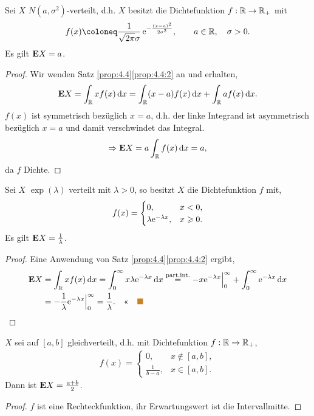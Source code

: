 \begin{bsp}
Sei $X$ $N(a, \sigma ^{2})$-verteilt, d.h. $X$ besitzt die Dichtefunktion $f:
\mathbb{R} \to \mathbb{R}_{+}$ mit
\begin{align*}
f(x) \defl \frac{1}{\sqrt{2 \pi }\sigma }\,\e^{-\frac{(x-a)^{2}}{2\sigma
^{2}}},\qquad a \in \R,\quad \sigma > 0.
\end{align*}
Es gilt $\textbf{E} X=a$.
\begin{proof}
Wir wenden Satz \ref{prop:4.4}\ref{prop:4.4:2} an und erhalten,
\begin{align*}
\textbf{E} X =\int_{\mathbb{R}} xf(x)\,\mathrm{d} x
= \int_{\mathbb{R}} (x-a)f(x)\,\mathrm{d} x + \int_{\mathbb{R}} a f(x) \,\mathrm{d} x.
\end{align*}
$f(x)$ ist symmetrisch bezüglich $x=a$, d.h. der linke Integrand ist
asymmetrisch bezüglich $x=a$ und damit verschwindet das Integral.
\begin{align*}
\Rightarrow \textbf{E} X = a \int_{\mathbb{R}} f(x)\,\mathrm{d} x = a,
\end{align*}
da $f$ Dichte.\qedhere\bsphere
\end{proof}
\end{bsp}
\begin{bsp}
Sei $X$ $\exp(\lambda)$ verteilt mit $\lambda > 0$, so besitzt $X$ die
Dichtefunktion $f$ mit,
\begin{align*}
f(x) =
\begin{cases}
0,& x < 0,\\
\lambda \mathrm{e}^{-\lambda x},& x \geqslant 0.
\end{cases}
\end{align*}
Es gilt $\textbf{E} X = \frac{1}{\lambda}$.
\begin{proof}
Eine Anwendung von Satz \ref{prop:4.4}\ref{prop:4.4:2} ergibt,
\begin{align*}
\E X &= \int_\R x f(x)\dx = \int_0^\infty x \lambda \e^{-\lambda x}\dx
\overset{\text{part.int.}}{=}
-x\e^{-\lambda x}\Big|_{0}^\infty + \int_0^\infty \e^{-\lambda x}\dx\\
&= -\frac{1}{\lambda}\e^{-\lambda x}\Big|_0^\infty
= \frac{1}{\lambda}.\qedhere\bsphere
\end{align*}
\end{proof}
%
\end{bsp}
\begin{bsp}
$X$ sei auf $[a,b]$ gleichverteilt, d.h. mit Dichtefunktion $f:\mathbb{R}\to\mathbb{R}_+$,
\begin{align*}
f(x) = 
\begin{cases}
0, & x\notin[a,b],\\
\frac{1}{b-a}, & x\in [a,b].
\end{cases}
\end{align*}
Dann ist $\textbf{E} X = \frac{a+b}{2}$.
\begin{proof}
$f$ ist eine Rechteckfunktion, ihr Erwartungswert ist die
Intervallmitte.\qedhere\bsphere
\end{proof}
\end{bsp}

